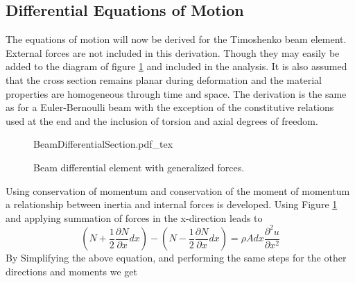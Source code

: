 \subsection{Differential Equations of Motion} \label{Differential Equations of Motion}
The equations of motion will now be derived for the Timoshenko beam element. External forces are not included in this derivation. Though they may easily be added to the diagram of figure \ref{fig:BeamDifferentialSection} and included in the analysis. It is also assumed that the cross section remains planar during deformation and the material properties are homogeneous through time and space. The derivation is the same as for a Euler-Bernoulli beam with the exception of the constitutive relations used at the end and the inclusion of torsion and axial degrees of freedom.
\begin{figure}
	\centering
	\def\svgwidth{600pt}
	{BeamDifferentialSection.pdf_tex}
	\caption{Beam differential element with generalized forces.}
	\label{fig:BeamDifferentialSection}
\end{figure}
Using conservation of momentum and conservation of the moment of momentum a relationship between inertia and internal forces is developed. Using Figure \ref{fig:BeamDifferentialSection} and applying summation of forces in the x-direction leads to
\begin{equation}\label{key}
(N+\frac{1}{2}\frac{\partial N}{\partial x}dx)-(N-\frac{1}{2}\frac{\partial N}{\partial x}dx)=\rho A dx \frac{\partial^2u}{\partial x^2}
\end{equation}
By Simplifying the above equation, and performing the same steps for the other directions and moments we get
